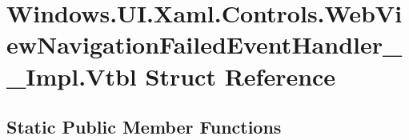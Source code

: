 \hypertarget{struct_windows_1_1_u_i_1_1_xaml_1_1_controls_1_1_web_view_navigation_failed_event_handler_____impl_1_1_vtbl}{}\section{Windows.\+U\+I.\+Xaml.\+Controls.\+Web\+View\+Navigation\+Failed\+Event\+Handler\+\_\+\+\_\+\+Impl.\+Vtbl Struct Reference}
\label{struct_windows_1_1_u_i_1_1_xaml_1_1_controls_1_1_web_view_navigation_failed_event_handler_____impl_1_1_vtbl}
\subsection*{Static Public Member Functions}
